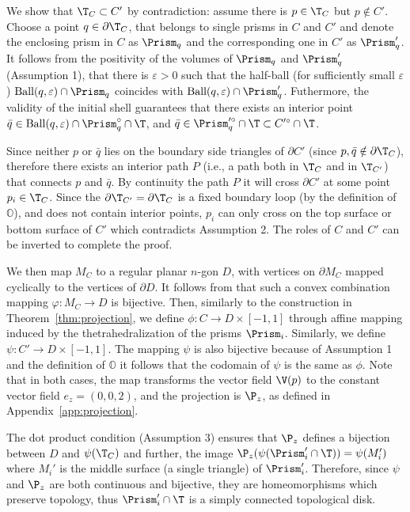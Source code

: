 We show that $\T_C \subset C'$ by contradiction: assume there is $p\in \T_C$ but $p \not\in C'$.
Choose a point $q \in \partial \T_C$,  that belongs to single prisms in $C$ and $C'$ and denote the enclosing prism in $C$ as $\Prism_q$ and the corresponding one in $C'$ as $\Prism_{q}'$.
It follows from the positivity of the volumes of $\Prism_q$ and $\Prism_q'$ (Assumption 1), that there is  $\varepsilon>0$ such that the half-ball (for sufficiently small $\varepsilon$)  $\text{Ball}(q, \varepsilon) \cap \Prism_q$  coincides with $ \text{Ball}(q, \varepsilon) \cap \Prism_q'$.
Futhermore, the validity of the initial shell guarantees that there exists an interior point $\bar{q} \in \text{Ball}(q, \varepsilon) \cap \Prism_q^\circ \cap \T$, and $\bar{q}\in \Prism_q'^\circ \cap \T \subset C'^\circ\cap \T$.

 Since neither $p$ or $\bar{q}$ lies on the boundary side triangles of $\partial C'$ (since $p,\bar{q}\notin\partial \T_C$), therefore there exists an interior path $P$ (i.e., a path both in $\T_C$ and in $\T_{C'}$) that connects $p$ and $\bar{q}$. By continuity the path $P$ it will cross $\partial C'$ at some point $p_i\in \T_C$. 
Since the $\partial \T_{C'} = \partial \T_C$ is a fixed boundary loop (by the definition of $\mathbb{O}$), and does not contain interior points, $p_i$ can only cross on the top surface or bottom surface of $C'$ which contradicts Assumption 2. The roles of $C$ and $C'$ can be inverted to complete the proof. 

We then  map $M_C$ to a
regular planar $n$-gon $D$, with vertices on $\partial M_C$ mapped cyclically to the vertices of $\partial D$.
It follows from \cite[Corollary 6.2]{floater2003one} that such a convex combination mapping $\varphi\colon M_C \to D$ is bijective. Then, similarly to the construction in Theorem~\ref{thm:projection},
we 
define $\phi\colon C \to D\times[-1,1]$ through affine mapping induced by the thetrahedralization of the prisms $\Prism_i$.
%
Similarly, we define $\psi \colon C' \to D\times[-1,1]$. The mapping $\psi$ is also bijective because of Assumption 1 and the definition of $\mathbb{O}$ it follows that the codomain of $\psi$ is the same as $\phi$.
%
Note that in both cases, the map transforms the vector field $\V(p)$ to the constant vector field $e_z = (0,0,2)$, and the projection is $\P_z$, as defined in Appendix~\ref{app:projection}. 

The dot product condition (Assumption 3) ensures that $\P_z$ defines a bijection between $D$ and $\psi(\T_C)$\revision{;} and further, the image  $\P_z(\psi(\Prism_i'\cap \T)) = \psi(M_i')$ where $M_i'$ is the middle surface (a single triangle) of $\Prism_i'$.
Therefore, since $\psi$ and $\P_z$ are both continuous and bijective, they are homeomorphisms which preserve topology, 
thus $\Prism_i'\cap \T $ is a simply connected topological disk.


